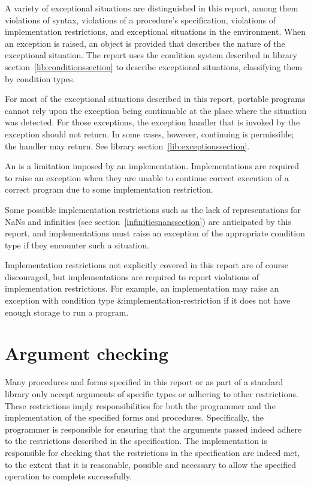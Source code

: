 A variety of exceptional situations
are distinguished in this report, among them violations of 
syntax, violations of a procedure's specification, violations of
implementation restrictions, and exceptional situations in the
environment.  When an exception is raised, an object is provided that
describes the nature of the exceptional situation.  The report uses
the condition system described in library section~\ref{lib:conditionssection} to
describe exceptional situations, classifying them by condition types.

For most of the exceptional situations described in this report,
portable programs cannot rely upon the exception being continuable
at the place where the situation was detected.
For those exceptions, the exception handler that is invoked by the
exception should not return.
In some cases, however, continuing is permissible; the
handler may return.  See library section~\ref{lib:exceptionssection}.

An  is a limitation imposed
by an implementation.  Implementations are required to raise an
exception when they are unable to continue correct execution of
a correct program due to some implementation restriction.

Some possible implementation restrictions
such as the lack of representations for NaNs and infinities (see
section~\ref{infinitiesnanssection}) are anticipated by this report,
and implementations must raise an exception of the appropriate
condition type if they encounter such a situation.

Implementation restrictions not explicitly covered in this report are
of course discouraged, but implementations are required to report
violations of implementation restrictions.
For example, an implementation may raise an exception
with condition type {\cf\&implementation-restriction} if it does not
have enough storage to run a program.

\section{Argument checking}
\label{argumentcheckingsection}

Many procedures and forms specified in this report or as part of a
standard library only accept arguments of specific types or adhering
to other restrictions.  These restrictions imply responsibilities for
both the programmer and the implementation of the specified forms and
procedures.  Specifically, the programmer is responsible for ensuring
that the arguments passed indeed adhere to the restrictions described
in the specification.  The implementation is responsible for checking
that the restrictions in the specification are indeed met, to the
extent that it is reasonable, possible and necessary to allow the
specified operation to complete successfully.

